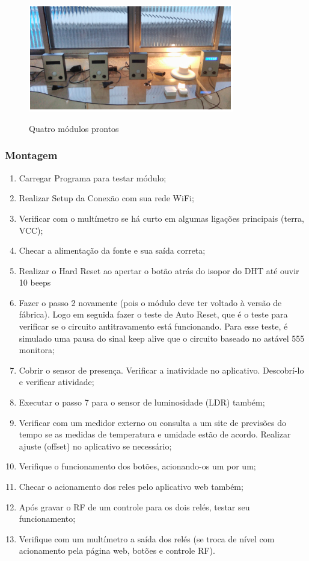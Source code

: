 \begin{enumerate}
	\begin{figure}[H]
		\centering
		\caption{Quatro módulos prontos}
		\includegraphics[width=0.8\textwidth]{QuatroModulos}
		\label{fig:QuatroModulos}
	\end{figure}

\end{enumerate}

\subsubsection {Montagem}
\begin{enumerate}
	\item Carregar Programa para testar módulo;
	\item Realizar Setup da Conexão com sua rede WiFi;
	\item Verificar com o multímetro se há curto em algumas ligações principais (terra, VCC);
	\item Checar a alimentação da fonte e sua saída correta;
	\item Realizar o Hard Reset ao apertar o botão atrás do isopor do DHT até ouvir 10 beeps
	\item Fazer o passo 2 novamente (pois o módulo deve ter voltado à versão de fábrica). Logo em seguida fazer o teste de Auto Reset, que é o teste para verificar se o circuito antitravamento está funcionando. Para esse teste, é simulado uma pausa do sinal keep alive que o circuito baseado no astável 555 monitora;
	\item Cobrir o sensor de presença. Verificar a inatividade no aplicativo. Descobrí-lo e verificar atividade;
	\item Executar o passo 7 para o sensor de luminosidade (LDR) também;
	\item Verificar com um medidor externo ou consulta a um site de previsões do tempo se as medidas de temperatura e umidade estão de acordo. Realizar ajuste (offset) no aplicativo se necessário;
	\item Verifique o funcionamento dos botões, acionando-os um por um;
	\item Checar o acionamento dos reles pelo aplicativo web também;
	\item Após gravar o RF de um controle para os dois relés, testar seu funcionamento;
	\item Verifique com um multímetro a saída dos relés (se troca de nível com acionamento pela página web, botões e controle RF).
\end{enumerate}
